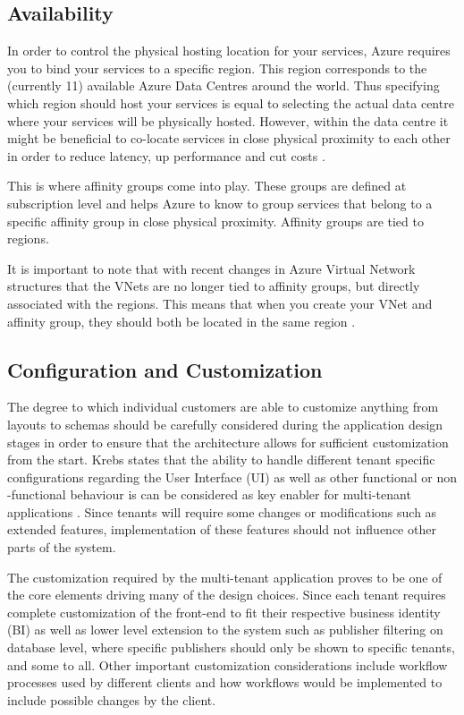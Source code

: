 \subsection{Availability}
\label{sec:availability}
In order to control the physical hosting location for your services, Azure requires you to bind your services to a specific region. This region corresponds to the (currently 11) available Azure Data Centres around the world\cite{Microsoft_Corporation2014-bf}. Thus specifying which region should host your services is equal to selecting the actual data centre where your services will be physically hosted. However, within the data centre it might be beneficial to co-locate services in close physical proximity to each other in order to reduce latency, up performance and cut costs \cite{Microsoft_Corporation2014-dn}.
 
This is where affinity groups come into play. These groups are defined at subscription level and helps Azure to know to group services that belong to a specific affinity group in close physical proximity. Affinity groups are tied to regions.
 
It is important to note that with recent changes in Azure Virtual Network structures that the VNets are no longer tied to affinity groups, but directly associated with the regions. This means that when you create your VNet and affinity group, they should both be located in the same region \cite{Microsoft_Corporation2014-dn}.

\subsection{Configuration and Customization}
\label{sec:custandconf}

The degree to which individual customers are able to customize anything from layouts to schemas should be carefully considered during the application design stages in order to ensure that the architecture allows for sufficient customization from the start. Krebs states that the ability to handle different tenant specific configurations regarding the User Interface (UI) as well as other functional or non -functional behaviour is can be considered as key enabler for multi-tenant applications \cite{Krebs2012}. Since tenants will require some changes or modifications such as extended features, implementation of these features should not influence other parts of the system.
 
The customization required by the multi-tenant application proves to be one of the core elements driving many of the design choices. Since each tenant requires complete customization of the front-end to fit their respective business identity (BI) as well as lower level extension to the system such as publisher filtering on database level, where specific publishers should only be shown to specific tenants, and some to all. Other important customization considerations include workflow processes used by different clients and how workflows would be implemented to include possible changes by the client.


